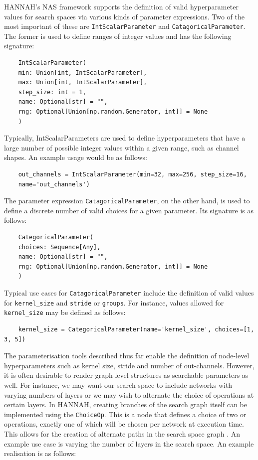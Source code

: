 \documentclass[11pt,a4paper, open=any]{scrbook}
\newcommand{\py}[1]{\texttt{#1}}
\begin{document}
HANNAH's NAS framework supports the definition of valid hyperparameter values for search spaces via various kinds of parameter expressions. Two of the most important of these are \py{IntScalarParameter} and \py{CatagoricalParameter}. The former is used to define ranges of integer values and has the following signature:

\begin{verbatim}
	IntScalarParameter(
	min: Union[int, IntScalarParameter],
	max: Union[int, IntScalarParameter],
	step_size: int = 1,
	name: Optional[str] = "",
	rng: Optional[Union[np.random.Generator, int]] = None
	)
\end{verbatim}
Typically, IntScalarParameters are used to define hyperparameters that have a large number of possible integer values within a given range, such as channel shapes. An example usage would be as follows:

\begin{verbatim}
	out_channels = IntScalarParameter(min=32, max=256, step_size=16,
	name='out_channels')
\end{verbatim}

The parameter expression \py{CatagoricalParameter}, on the other hand, is used to define a discrete number of valid choices for a given parameter. Its signature is as follows:

\begin{verbatim}
	CategoricalParameter(
	choices: Sequence[Any],
	name: Optional[str] = "",
	rng: Optional[Union[np.random.Generator, int]] = None
	)
\end{verbatim}
Typical use cases for \py{CatagoricalParameter} include the definition of valid values for \py{kernel_size} and \py{stride} or \py{groups}. For instance, values allowed for \py{kernel_size} may be defined as follows:

\begin{verbatim}
	kernel_size = CategoricalParameter(name='kernel_size', choices=[1, 3, 5])
\end{verbatim}

The parameterisation tools described thus far enable the definition of node-level hyperparameters such as kernel size, stride and number of out-channels. However, it is often desirable to render graph-level structures as searchable parameters as well. For instance, we may want our search space to include networks with varying numbers of layers or we may wish to alternate the choice of operations at certain layers. In HANNAH, creating branches of the search graph itself can be implemented using the \py{ChoiceOp}. This is a node that defines a choice of two or operations, exactly one of which will be chosen per network at execution time. This allows for the creation of alternate paths in the search space graph \cite{ekutesSearchSpaces}. An example use case is varying the number of layers in the search space. An example realisation is as follows:
\end{document}
